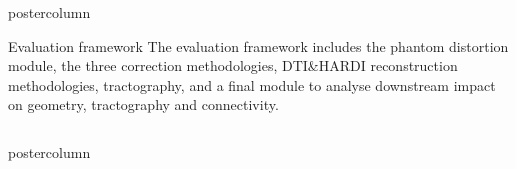 \documentclass[final,hyperref={pdfpagelabels=false}]{beamer}
\newlength{\columnheight}
\begin{document}
\begin{frame}[t]
{\begin{minipage}[t][\columnheight][c]{0.95\textwidth}
{\begin{columns}[t,totalwidth=\textwidth]
\begin{column}{.64\linewidth}
\begin{beamercolorbox}[center,wd=\textwidth]{postercolumn}
\begin{minipage}[T]{.95\textwidth}
{\begin{block}{Evaluation framework}
          The evaluation framework includes the phantom distortion module, the three correction
          methodologies, DTI\&HARDI reconstruction methodologies, tractography,
          and a final module to analyse downstream impact on geometry, tractography and connectivity.
          \end{block}
          }
        \end{minipage}
      \end{beamercolorbox}
    \end{column}
  \end{columns}
  \vfill
  \noindent{}
  \vfill
  \begin{columns}[T,totalwidth=\textwidth]
    \begin{column}{.34\textwidth}
      \begin{beamercolorbox}[center,wd=\textwidth]{postercolumn}
        \begin{minipage}[T]{\textwidth}  %
          \noindent\parbox[t]{\textwidth}{ %
}
\end{minipage}
\end{beamercolorbox}
\end{column}
\end{columns}}
\end{minipage}}
\end{frame}
\end{document}
